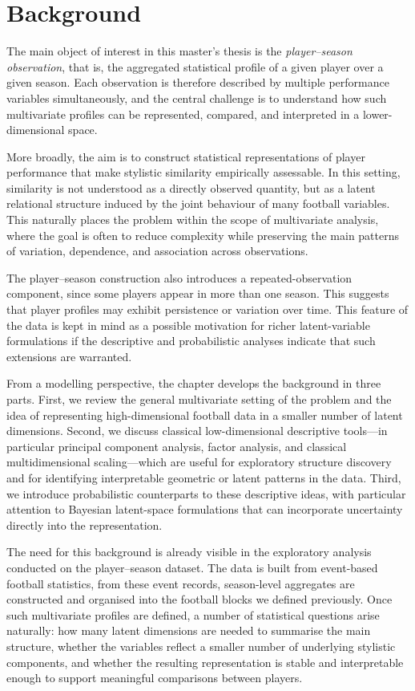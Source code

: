 \chapter{Background}
\label{chap:background}

The main object of interest in this master's thesis is the \emph{player--season observation}, that is, the aggregated statistical profile of a given player over a given season. Each observation is therefore described by multiple performance variables simultaneously, and the central challenge is to understand how such multivariate profiles can be represented, compared, and interpreted in a lower-dimensional space.

More broadly, the aim is to construct statistical representations of player performance that make stylistic similarity empirically assessable. In this setting, similarity is not understood as a directly observed quantity, but as a latent relational structure induced by the joint behaviour of many football variables. This naturally places the problem within the scope of multivariate analysis, where the goal is often to reduce complexity while preserving the main patterns of variation, dependence, and association across observations.

The player--season construction also introduces a repeated-observation component, since some players appear in more than one season. This suggests that player profiles may exhibit persistence or variation over time. This feature of the data is kept in mind as a possible motivation for richer latent-variable formulations if the descriptive and probabilistic analyses indicate that such extensions are warranted. 

From a modelling perspective, the chapter develops the background in three parts. First, we review the general multivariate setting of the problem and the idea of representing high-dimensional football data in a smaller number of latent dimensions. Second, we discuss classical low-dimensional descriptive tools---in particular principal component analysis, factor analysis, and classical multidimensional scaling---which are useful for exploratory structure discovery and for identifying interpretable geometric or latent patterns in the data. Third, we introduce probabilistic counterparts to these descriptive ideas, with particular attention to Bayesian latent-space formulations that can incorporate uncertainty directly into the representation.

The need for this background is already visible in the exploratory analysis conducted on the player--season dataset. The data is built from event-based football statistics, from these event records, season-level aggregates are constructed and organised into the football blocks we defined previously. Once such multivariate profiles are defined, a number of statistical questions arise naturally: how many latent dimensions are needed to summarise the main structure, whether the variables reflect a smaller number of underlying stylistic components, and whether the resulting representation is stable and interpretable enough to support meaningful comparisons between players.

